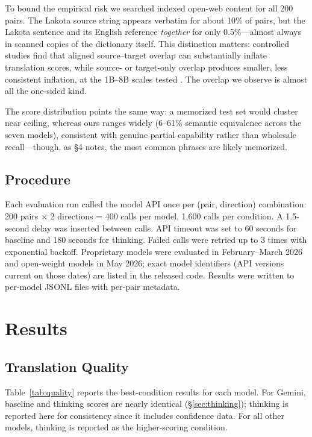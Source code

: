 \documentclass[11pt]{article}
\begin{document}
To bound the empirical risk we searched indexed open-web content for all 200 pairs. The Lakota source string appears verbatim for about 10\% of pairs, but the Lakota sentence and its English reference \emph{together} for only 0.5\%---almost always in scanned copies of the dictionary itself. This distinction matters: controlled studies find that aligned source--target overlap can substantially inflate translation scores, while source- or target-only overlap produces smaller, less consistent inflation, at the 1B--8B scales tested \cite{kocyigit2025}. The overlap we observe is almost all the one-sided kind.

The score distribution points the same way: a memorized test set would cluster near ceiling, whereas ours ranges widely (6--61\% semantic equivalence across the seven models), consistent with genuine partial capability rather than wholesale recall---though, as \S4 notes, the most common phrases are likely memorized.

\subsection{Procedure}

Each evaluation run called the model API once per (pair, direction) combination: 200 pairs $\times$ 2 directions = 400 calls per model, 1,600 calls per condition. A 1.5-second delay was inserted between calls. API timeout was set to 60 seconds for baseline and 180 seconds for thinking. Failed calls were retried up to 3 times with exponential backoff. Proprietary models were evaluated in February--March 2026 and open-weight models in May 2026; exact model identifiers (API versions current on those dates) are listed in the released code. Results were written to per-model JSONL files with per-pair metadata.

\section{Results}

\subsection{Translation Quality}

Table~\ref{tab:quality} reports the best-condition results for each model. For Gemini, baseline and thinking scores are nearly identical (\S\ref{sec:thinking}); thinking is reported here for consistency since it includes confidence data. For all other models, thinking is reported as the higher-scoring condition.
\end{document}
